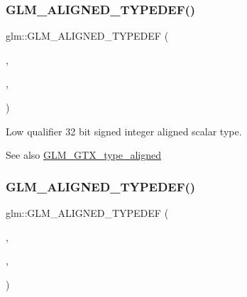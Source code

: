 \subsubsection{\texorpdfstring{G\+L\+M\+\_\+\+A\+L\+I\+G\+N\+E\+D\+\_\+\+T\+Y\+P\+E\+D\+E\+F()}{GLM\_ALIGNED\_TYPEDEF()}\hspace{0.1cm}{\footnotesize\ttfamily [7/209]}}
{\footnotesize\ttfamily glm\+::\+G\+L\+M\+\_\+\+A\+L\+I\+G\+N\+E\+D\+\_\+\+T\+Y\+P\+E\+D\+EF (\begin{DoxyParamCaption}\item[{\hyperlink{group__gtc__type__precision_gad9567c806dc39f534174eef42663119d}{lowp\+\_\+int32\+\_\+t}}]{,  }\item[{aligned\+\_\+lowp\+\_\+int32\+\_\+t}]{,  }\item[{4}]{ }\end{DoxyParamCaption})}

Low qualifier 32 bit signed integer aligned scalar type. \begin{DoxySeeAlso}{See also}
\hyperlink{group__gtx__type__aligned}{G\+L\+M\+\_\+\+G\+T\+X\+\_\+type\+\_\+aligned} 
\end{DoxySeeAlso}
\mbox{\label{group__gtx__type__aligned_ga7ccb60f3215d293fd62b33b31ed0e7be}} 
\subsubsection{\texorpdfstring{G\+L\+M\+\_\+\+A\+L\+I\+G\+N\+E\+D\+\_\+\+T\+Y\+P\+E\+D\+E\+F()}{GLM\_ALIGNED\_TYPEDEF()}\hspace{0.1cm}{\footnotesize\ttfamily [8/209]}}
{\footnotesize\ttfamily glm\+::\+G\+L\+M\+\_\+\+A\+L\+I\+G\+N\+E\+D\+\_\+\+T\+Y\+P\+E\+D\+EF (\begin{DoxyParamCaption}\item[{\hyperlink{group__gtc__type__precision_ga14d72e76d57c7f28eca8e933816c9fd6}{lowp\+\_\+int64\+\_\+t}}]{,  }\item[{aligned\+\_\+lowp\+\_\+int64\+\_\+t}]{,  }\item[{8}]{ }\end{DoxyParamCaption})}

